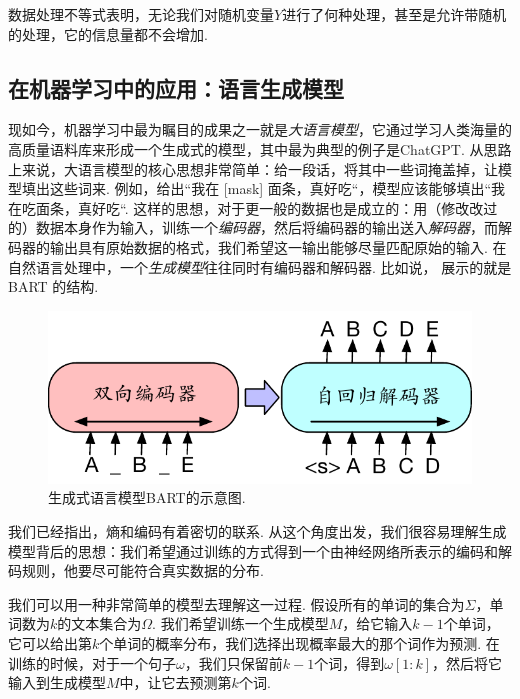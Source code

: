 数据处理不等式表明，无论我们对随机变量$Y$进行了何种处理，甚至是允许带随机的处理，它的信息量都不会增加. 

\subsection{在机器学习中的应用：语言生成模型}
现如今，机器学习中最为瞩目的成果之一就是\emph{大语言模型}，它通过学习人类海量的高质量语料库来形成一个生成式的模型，其中最为典型的例子是ChatGPT. 从思路上来说，大语言模型的核心思想非常简单：给一段话，将其中一些词掩盖掉，让模型填出这些词来. 例如，给出“我在 [mask] 面条，真好吃“，模型应该能够填出“我在吃面条，真好吃“. 这样的思想，对于更一般的数据也是成立的：用（修改改过的）数据本身作为输入，训练一个\emph{编码器}，然后将编码器的输出送入\emph{解码器}，而解码器的输出具有原始数据的格式，我们希望这一输出能够尽量匹配原始的输入. 在自然语言处理中，一个\emph{生成模型}往往同时有编码器和解码器. 比如说， 展示的就是BART  \cite{lewisBARTDenoisingSequencetoSequence2019} 的结构.

\begin{figure}[ht]
    \centering
    \includegraphics[scale=0.6]{Chapters/information-theory/figures/bart.pdf}
    \caption{生成式语言模型BART的示意图.}
    \label{fig:autoencoder}
\end{figure}

我们已经指出，熵和编码有着密切的联系. 从这个角度出发，我们很容易理解生成模型背后的思想：我们希望通过训练的方式得到一个由神经网络所表示的编码和解码规则，他要尽可能符合真实数据的分布.

我们可以用一种非常简单的模型去理解这一过程. 假设所有的单词的集合为$\Sigma$，单词数为$k$的文本集合为$\Omega$. 我们希望训练一个生成模型$M$，给它输入$k-1$个单词，它可以给出第$k$个单词的概率分布，我们选择出现概率最大的那个词作为预测. 在训练的时候，对于一个句子$\omega$，我们只保留前$k-1$个词，得到$\omega[1:k]$，然后将它输入到生成模型$M$中，让它去预测第$k$个词. 


